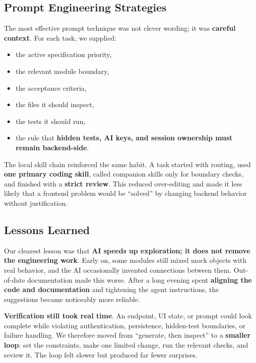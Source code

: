 \documentclass[11pt,a4paper]{article}
\begin{document}
\subsection{Prompt Engineering Strategies}

The most effective prompt technique was not clever wording; it was \textbf{careful context}. For each task, we supplied:

\begin{itemize}
  \item the active specification priority,
  \item the relevant module boundary,
  \item the acceptance criteria,
  \item the files it should inspect,
  \item the tests it should run,
  \item the rule that \textbf{hidden tests, AI keys, and session ownership must remain backend-side}.
\end{itemize}

The local skill chain reinforced the same habit. A task started with routing, used \textbf{one primary coding skill}, called companion skills only for boundary checks, and finished with a \textbf{strict review}. This reduced over-editing and made it less likely that a frontend problem would be ``solved'' by changing backend behavior without justification.

\subsection{Lessons Learned}

Our clearest lesson was that \textbf{AI speeds up exploration; it does not remove the engineering work}. Early on, some modules still mixed mock objects with real behavior, and the AI occasionally invented connections between them. Out-of-date documentation made this worse. After a long evening spent \textbf{aligning the code and documentation} and tightening the agent instructions, the suggestions became noticeably more reliable.

\textbf{Verification still took real time}. An endpoint, UI state, or prompt could look complete while violating authentication, persistence, hidden-test boundaries, or failure handling. We therefore moved from ``generate, then inspect'' to a \textbf{smaller loop}: set the constraints, make one limited change, run the relevant checks, and review it. The loop felt slower but produced far fewer surprises.
\end{document}

